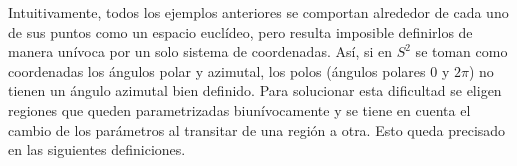 \documentclass[../VD.tex]{subfiles}
\begin{document}
Intuitivamente, todos los ejemplos anteriores se comportan alrededor de cada uno
de sus puntos como un espacio euclídeo, pero resulta imposible definirlos de
manera unívoca por un solo sistema de coordenadas. Así, si en $S^{2}$ se toman
como coordenadas los ángulos polar y azimutal, los polos (ángulos polares $0$ y
$2\pi$) no tienen un ángulo azimutal bien definido. Para solucionar esta
dificultad se eligen regiones que queden parametrizadas biunívocamente y se
tiene en cuenta el cambio de los parámetros al transitar de una región a otra.
Esto queda precisado en las siguientes definiciones.
\end{document}
